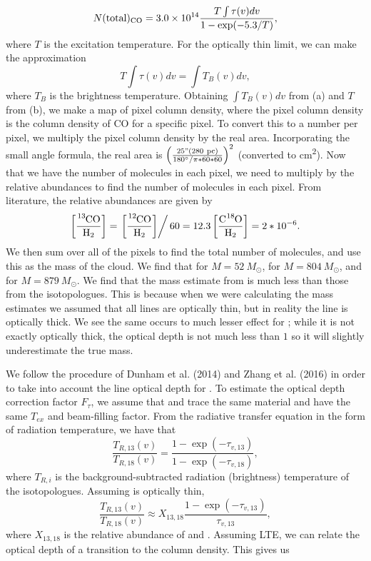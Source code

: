 \documentclass[11pt]{article}
\newenvironment{tight_enumerate}{
\begin{enumerate}[label=(\alph*)]
\setlength{\itemsep}{3pt}
\setlength{\parskip}{0pt}
}{\end{enumerate}}
\begin{document}
\begin{tight_enumerate}
\[N(\text{total})_{\ce{CO}} = 3.0 \times 10^{14} \frac{T\int{\tau(v)dv}}{1-\exp(-5.3/T)},\]
where $T$ is the excitation temperature. For the optically thin limit, we can make the approximation 
\[T\int{\tau(v)dv} = \int{T_{B}(v)dv},\]
where $T_{B}$ is the brightness temperature. Obtaining $\int{T_{B}(v)dv}$ from (a) and $T$ from (b), we make a map of  pixel column density, where the pixel column density is the column density of CO for a specific pixel. To convert this to a number per pixel, we multiply the pixel column density by the real area. Incorporating the small angle formula, the real area is $\left(\frac{25"(280\ \si{pc})}{180\degree/\pi*60*60}\right)^{2}$ (converted to \si{cm^{2}}). Now that we have the number of  molecules in each pixel, we need to multiply by the relative abundances to find the number of  molecules in each pixel. From literature, the relative abundances are given by 
\[\left[\frac{\ce{^{13}CO}}{\ce{H2}}\right] = \left.\left[\frac{\ce{^{12}CO}}{\ce{H2}}\right]\right/60 = 12.3\left[\frac{\ce{C^{18}O}}{\ce{H2}}\right] = 2*10^{-6}.\] 
We then sum over all of the pixels to find the total number of  molecules, and use this as the mass of the cloud. We find that for  $M = 52\ M_{\odot}$, for  $M = 804\ M_{\odot}$, and for  $M = 879\ M_{\odot}$. We find that the mass estimate from  is much less than those from the isotopologues. This is because when we were calculating the mass estimates we assumed that all lines are optically thin, but in reality the  line is optically thick. We see the same occurs to much lesser effect for ; while it is not exactly optically thick, the optical depth is not much less than $1$ so it will slightly underestimate the true mass.
\item We follow the procedure of Dunham et al. (2014) and Zhang et al. (2016) in order to take into account the line optical depth for . To estimate the optical depth correction factor $F_{\tau}$, we assume that  and  trace the same material and have the same $T_{ex}$ and beam-filling factor. From the radiative transfer equation in the form of radiation temperature, we have that 
\[\frac{T_{R,13}(v)}{T_{R,18}(v)} = \frac{1-\exp(-\tau_{v,13})}{1-\exp(-\tau_{v,18})},\] 
where $T_{R,i}$ is the background-subtracted radiation (brightness) temperature of the isotopologues. Assuming  is optically thin, 
\[\frac{T_{R,13}(v)}{T_{R,18}(v)} \approx X_{13,18}\frac{1-\exp(-\tau_{v,13})}{\tau_{v,13}},\]
where $X_{13,18}$ is the relative abundance of  and . Assuming LTE, we can relate the optical depth of a transition to the column density. This gives us 

\end{tight_enumerate}
\end{document}
